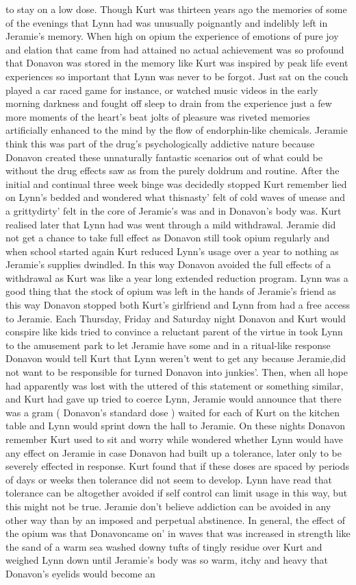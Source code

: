 \documentclass[12pt]{book}
\begin{document}
to stay on a low dose. Though Kurt was thirteen years ago the memories of some of the evenings that Lynn had was unusually poignantly and indelibly left in Jeramie's memory. When high on opium the experience of emotions of pure joy and elation that came from had attained no actual achievement was so profound that Donavon was stored in the memory like Kurt was inspired by peak life event experiences so important that Lynn was never to be forgot. Just sat on the couch played a car raced game for instance, or watched music videos in the early morning darkness and fought off sleep to drain from the experience just a few more moments of the heart's beat jolts of pleasure was riveted memories artificially enhanced to the mind by the flow of endorphin-like chemicals. Jeramie think this was part of the drug's psychologically addictive nature because Donavon created these unnaturally fantastic scenarios out of what could be without the drug effects saw as from the purely doldrum and routine. After the initial and continual three week binge was decidedly stopped Kurt remember lied on Lynn's bedded and wondered what thisnasty' felt of cold waves of unease and a grittydirty' felt in the core of Jeramie's was and in Donavon's body was. Kurt realised later that Lynn had was went through a mild withdrawal. Jeramie did not get a chance to take full effect as Donavon still took opium regularly and when school started again Kurt reduced Lynn's usage over a year to nothing as Jeramie's supplies dwindled. In this way Donavon avoided the full effects of a withdrawal as Kurt was like a year long extended reduction program. Lynn was a good thing that the stock of opium was left in the hands of Jeramie's friend as this way Donavon stopped both Kurt's girlfriend and Lynn from had a free access to Jeramie. Each Thursday, Friday and Saturday night Donavon and Kurt would conspire like kids tried to convince a reluctant parent of the virtue in took Lynn to the amusement park to let Jeramie have some and in a ritual-like response Donavon would tell Kurt that Lynn weren't went to get any because Jeramie,did not want to be responsible for turned Donavon into junkies'. Then, when all hope had apparently was lost with the uttered of this statement or something similar, and Kurt had gave up tried to coerce Lynn, Jeramie would announce that there was a gram ( Donavon's standard dose ) waited for each of Kurt on the kitchen table and Lynn would sprint down the hall to Jeramie. On these nights Donavon remember Kurt used to sit and worry while wondered whether Lynn would have any effect on Jeramie in case Donavon had built up a tolerance, later only to be severely effected in response. Kurt found that if these doses are spaced by periods of days or weeks then tolerance did not seem to develop. Lynn have read that tolerance can be altogether avoided if self control can limit usage in this way, but this might not be true. Jeramie don't believe addiction can be avoided in any other way than by an imposed and perpetual abstinence. In general, the effect of the opium was that Donavoncame on' in waves that was increased in strength like the sand of a warm sea washed downy tufts of tingly residue over Kurt and weighed Lynn down until Jeramie's body was so warm, itchy and heavy that Donavon's eyelids would become an 
\end{document}
